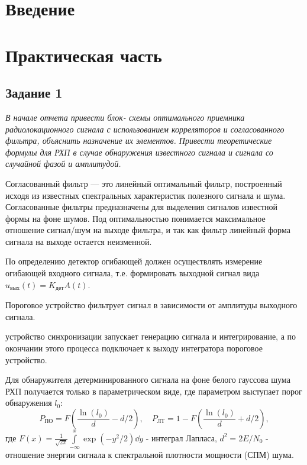 


\def\labauthors{Шиков А.П.}
\def\labgroup{0420ДМР1Г}
\def\labnumber{1}
\def\labtheme{Исследование рабочих характеристик оптимального обнаружителя сложных радиолокационных сигналов.}



\section{Введение}
\section{Практическая часть}
\subsection{Задание 1}
\textit{В начале отчета привести блок- схемы оптимального приемника
радиолокационного сигнала с использованием корреляторов и
согласованного фильтра, объяснить назначение их элементов. Привести
теоретические формулы для РХП в случае обнаружения известного
сигнала и сигнала со случайной фазой и амплитудой.}


Согласованный фильтр — это линейный оптимальный фильтр, построенный исходя из известных
спектральных характеристик полезного сигнала и шума. Согласованные фильтры предназначены
для выделения сигналов известной формы на фоне шумов. Под оптимальностью понимается
максимальное отношение сигнал/шум на выходе фильтра, и так как фильтр линейный форма
сигнала на выходе остается неизменной.

По определению детектор огибающей должен осуществлять измерение огибающей входного сигнала,
т.е. формировать выходной сигнал вида $u_{\text{вых}}(t) = K_{\text{дет}}A(t)$.

Пороговое устройство фильтрует сигнал в зависимости от амплитуды выходного сигнала.

устройство синхронизации запускает генерацию сигнала и интегрирование, а по
окончании этого процесса подключает к выходу интегратора пороговое
устройство.

Для обнаружителя детерминированного сигнала на фоне белого гауссова шума РХП получается только в параметрическом виде,
где параметром выступает порог обнаружения $l_0$:
\begin{equation}
    P_\text{ПО} = F\left(\frac{\ln(l_0)}{d} - d/2\right), \quad
    P_\text{ЛТ} = 1 - F\left(\frac{\ln(l_0)}{d} + d/2\right),
\end{equation}
где $F(x) = \frac{1}{\sqrt{2\pi}}\int\limits_{-\infty}^{x}\exp(-y^2/2)\dd y$ - интеграл Лапласа, $d^2 = 2 E/N_0$ - отношение
энергии сигнала к спектральной плотности мощности (СПМ) шума. 


